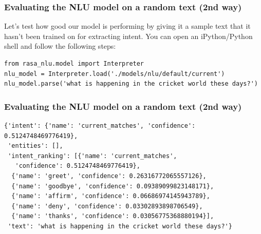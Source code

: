  \begin{frame}[fragile]\frametitle{Evaluating the NLU model on a random text (2nd way)}
 

Let’s test how good our model is performing by giving it a sample text that it hasn’t been trained on for extracting intent. You can open an iPython/Python shell and follow the following steps: 
\begin{lstlisting}
from rasa_nlu.model import Interpreter
nlu_model = Interpreter.load('./models/nlu/default/current')
nlu_model.parse('what is happening in the cricket world these days?')
\end{lstlisting}
 
\end{frame}

 \begin{frame}[fragile]\frametitle{Evaluating the NLU model on a random text (2nd way)}

\begin{lstlisting}
{'intent': {'name': 'current_matches', 'confidence': 0.5124748469776419},
 'entities': [],
 'intent_ranking': [{'name': 'current_matches',
   'confidence': 0.5124748469776419},
  {'name': 'greet', 'confidence': 0.26316772065557126},
  {'name': 'goodbye', 'confidence': 0.09389099823148171},
  {'name': 'affirm', 'confidence': 0.06686974145943789},
  {'name': 'deny', 'confidence': 0.03302893898706549},
  {'name': 'thanks', 'confidence': 0.03056775368880194}],
 'text': 'what is happening in the cricket world these days?'}
\end{lstlisting}

\end{frame}



